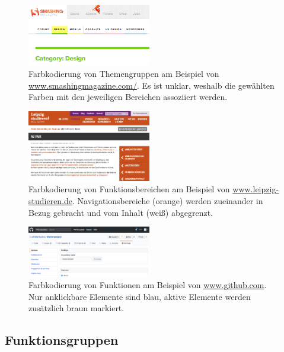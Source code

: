 \begin{figure}[]
	\centering
	\includegraphics[width=0.48\textwidth]{img/theme_coding.png}
	\caption{Farbkodierung von Themengruppen am Beispiel von \url{www.smashingmagazine.com/}. Es ist unklar, weshalb die gewählten Farben mit den jeweiligen Bereichen assoziiert werden.}
	\label{fig:theme_coding}
\end{figure}

\begin{figure}[]
	\centering
	\includegraphics[width=0.48\textwidth]{img/functional_areas.png}
	\caption{Farbkodierung von Funktionsbereichen am Beispiel von \url{www.leipzig-studieren.de}. Navigationsbereiche (orange) werden zueinander in Bezug gebracht und vom Inhalt (weiß) abgegrenzt.}
	\label{fig:functional_areas}
\end{figure}

\begin{figure}[]
	\centering
	\includegraphics[width=0.48\textwidth]{img/functions.png}
	\caption{Farbkodierung von Funktionen am Beispiel von \url{www.github.com}. Nur anklickbare Elemente sind blau, aktive Elemente werden zusätzlich braun markiert.}
	\label{fig:functions}
\end{figure}

\subsection{Funktionsgruppen}
\label{sec:funktionsgruppen}

